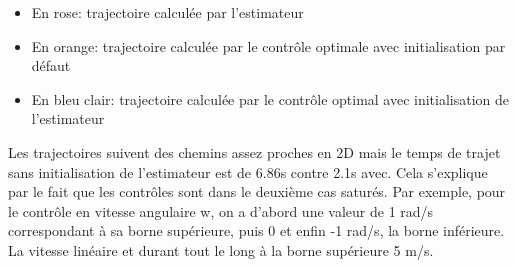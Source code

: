 \documentclass[a4paper,12pt]{report}
\newcommand{\itemo}{\item[\textsf{o}]}
\begin{document}
\begin{itemize}
	\itemo En rose: trajectoire calculée par l'estimateur
	\itemo En orange: trajectoire calculée par le contrôle optimale avec initialisation par défaut
	\itemo En bleu clair: trajectoire calculée par le contrôle optimal avec initialisation de l'estimateur
\end{itemize}

Les trajectoires suivent des chemins assez proches en 2D mais le temps de trajet sans initialisation de l'estimateur est de 6.86s contre 2.1s avec. Cela s'explique par le fait que les contrôles sont dans le deuxième cas saturés. Par exemple, pour le contrôle en vitesse angulaire w, on a d'abord une valeur de 1 rad/s correspondant à sa borne supérieure, puis 0 et enfin -1 rad/s, la borne inférieure. La vitesse linéaire et durant tout le long à la borne supérieure 5 m/s.
\end{document}

